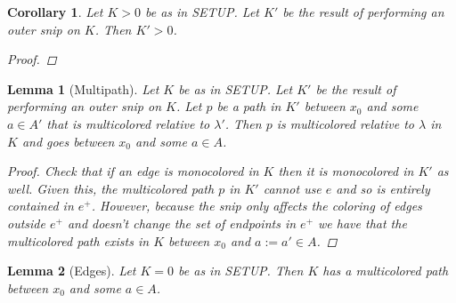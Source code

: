 \documentclass{article}
\theoremstyle{mystyle}
\newtheorem{lem}{Lemma}[section]
\newtheorem*{cor*}{Corollary}
\theoremstyle{remark}
\begin{document}
\begin{cor*}
	Let \(K > 0\) be as in SETUP. Let \(K'\) be the result of performing an outer snip on \(K\). Then \(K' > 0\).
	\begin{proof}
		
	\end{proof}
\end{cor*}
\begin{lem}
	[Multipath]
	 \label{lem:multi} 
	Let \(K\) be as in SETUP. Let \(K'\) be the result of performing an outer snip on \(K\). Let \(p\) be a path in \(K'\) between \(x_{0}\) and some \(a \in A'\) that is {\em multicolored} relative to \(\lambda'\). Then \(p\) is multicolored relative to \(\lambda\) in \(K\) and goes between \(x_{0}\) and some \(a \in A\).
	\begin{proof}
		Check that if an edge is monocolored in \(K\) then it is monocolored in \(K'\) as well. Given this, the multicolored path \(p\) in \(K'\) cannot use \(e\) and so is entirely contained in \(e^{+}\). However, because the snip only affects the coloring of edges outside \(e^{+}\) and doesn't change the set of endpoints in \(e^{+}\) we have that the multicolored path exists in \(K\) between \(x_{0}\) and \(a:=a' \in A\).
	\end{proof}
\end{lem}
\begin{lem}
	[Edges]
	 \label{edges} 
	  Let \(K=0\) be as in SETUP. Then \(K\) has a multicolored path between \(x_{0}\) and some \(a \in A\).
\end{lem}
\end{document}
